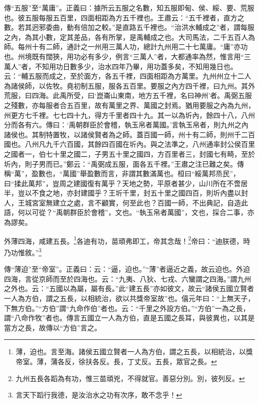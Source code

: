 {\noindent\zhuan{}\fzbyks 傳“五服”至“萬庸”。正義曰：據所云五服之名數，知五服即甸、侯、綏、要、荒服也。彼五服每服五百里，四面相距為方五千裡也。王肅云：“五千裡者，直方之數。若其迥邪委曲，動有倍加之較。”是直路五千裡也。“治洪水輔成之”者，謂每服之內，為其小數，定其差品，各有所掌，是禹輔成之也。大司馬法，二千五百人為師。每州十有二師，通計之一州用三萬人功，總計九州用二十七萬庸。“庸”亦功也。州境既有闊狹，用功必有多少，例言“三萬人”者，大都通率為然，惟言用“三萬人”者，不知用功日數多少，治水四年乃畢，用功蓋多矣，不知用幾日也。云：“輔五服而成之，至於面方，各五千裡，四面相距為方萬里。九州州立十二人為諸侯師，以佐牧。堯初制五服，服各五百里。要服之內方四千裡，曰九州。其外荒服，曰四海。此禹所受，曰‘崑崙山東南，地方五千裡，名曰神州’者。禹弼五服之殘數，亦每服者合五百里，故有萬里之界、萬國之封焉。猶用要服之內為九州，州更方七千裡。七七四十九，得方千里者四十九。其一以為圻內，餘四十八，八州分而各有六。傳曰：‘禹朝群臣於會稽，執玉帛者萬國。’言執玉帛者，則九州之內諸侯也。其制特置牧，以諸侯賢者為之師。蓋百國一師，州十有二師，則州千二百國也。八州凡九千六百國，其餘四百國在圻內。與之法準之，八州通率封公侯百里之國者一，伯七十里之國二，子男五十里之國四，方百里者三，封國七有畸，至於圻內，則子男而已。”鄭云：“禹弼成五服，面各五千裡。”王肅之注已難之矣。傳稱“萬”，盈數也，“萬國”舉盈數而言，非謂其數滿萬也。桓曰“綏萬邦烝民”，曰“揉此萬邦”，豈周之建國復有萬乎？天地之勢，平原者甚少，山川所在不啻居半，豈以不食之地，亦封建國乎？王圻千里，封五十里之國四百，則圻內盡以封人，王城宮室無建立之處，言不顧實，何至此也？百國一師，不出典記，自造此語，何以可從？“禹朝群臣於會稽”，文也。“執玉帛者萬國”，文也，採合二事，亦為謬矣。 \par}

外薄四海，咸建五長。\footnote{薄，迫也。言至海。諸侯五國立賢者一人為方伯，謂之五長，以相統治，以獎帝室。薄，蒲各反，徐扶各反。長，丁丈反。五長，眾官之長。}各迪有功，苗頑弗即工，帝其念哉！\footnote{九州五長各蹈為有功，惟三苗頑兇，不得就官。善惡分別。別，彼列反。}帝曰：“迪朕德，時乃功惟敘。”\footnote{言天下蹈行我德，是汝治水之功有次序，敢不念乎！}

{\noindent\zhuan{}\fzbyks 傳“薄迫”至“帝室”。正義曰：云：“逼，迫也。”“薄”者逼近之義，故云迫也。外迫四海，言從京師而至於四海也。云：“九夷、八狄、七戎、六蠻謂之四海。”謂九州之外也。云：“五國以為屬，屬有長。”此“建五長”亦如彼文，故云“諸侯五國立賢者一人為方伯，謂之五長，以相統治，欲以共獎帝室故”也。僖元年曰：“上無天子，下無方伯。”“方伯”謂“九命作伯”者也。云：“千里之外設方伯。”“方伯”一為之長，謂“八命作牧”者也。傳言五國立一人為方伯，直是五國之長耳，與彼異也，以其是當方之長，故傳以“方伯”言之。 \par}


